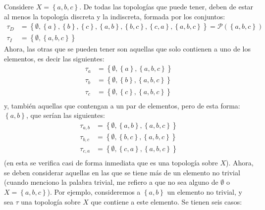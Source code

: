 \documentclass[12pt]{report}
\theoremstyle{largebreak}
\begin{document}
    \begin{sol}
        Considere $X=\left\{a,b,c\right\}$. De todas las topologías que puede tener, deben de estar al menos la topología discreta y la indiscreta, formada por los conjuntos:
        \begin{equation*}
            \begin{split}
                \tau_D&=\left\{\emptyset, \left\{a\right\},\left\{b\right\}, \left\{c\right\}, \left\{a,b\right\},\left\{b,c\right\},\left\{c,a\right\},\left\{a,b,c\right\} \right\}=\mathcal{P}(\left\{a,b,c\right\})\\
                \tau_I&=\left\{\emptyset,\left\{a,b,c\right\} \right\}
            \end{split}
        \end{equation*}
        Ahora, las otras que se pueden tener son aquellas que solo contienen a uno de los elementos, es decir las siguientes:
        \begin{equation*}
            \begin{split}
                \tau_a&=\left\{\emptyset,\left\{a\right\},\left\{a,b,c\right\}\right\}\\
                \tau_b&=\left\{\emptyset,\left\{b\right\},\left\{a,b,c\right\}\right\}\\
                \tau_c&=\left\{\emptyset,\left\{c\right\},\left\{a,b,c\right\}\right\}\\
            \end{split}
        \end{equation*}
        y, también aquellas que contengan a un par de elementos, pero de esta forma: $\left\{a,b\right\}$, que serían las siguientes:
        \begin{equation*}
            \begin{split}
                \tau_{a,b}&=\left\{\emptyset,\left\{a,b\right\},\left\{a,b,c\right\}\right\}\\
                \tau_{b,c}&=\left\{\emptyset,\left\{b,c\right\},\left\{a,b,c\right\}\right\}\\
                \tau_{c,a}&=\left\{\emptyset,\left\{c,a\right\},\left\{a,b,c\right\}\right\}\\
            \end{split}
        \end{equation*}
        (en esta se verifica casi de forma inmediata que es una topología sobre $X$). Ahora, se deben considerar aquellas en las que se tiene más de un elemento no trivial (cuando menciono la palabra trivial, me refiero a que no sea alguno de $\emptyset$ o $X=\left\{a,b,c\right\}$). Por ejemplo, consideremos a $\left\{a,b\right\}$ un elemento no trivial, y sea $\tau$ una topología sobre $X$ que contiene a este elemento. Se tienen seis casos:

\end{sol}
\end{document}
